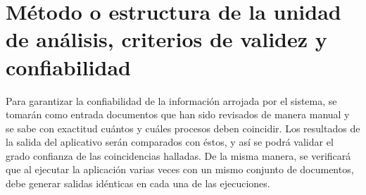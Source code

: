 \chapter{M\'etodo o estructura de la unidad de an\'alisis, criterios de validez y confiabilidad}
\label{sec:analisis}
Para garantizar la confiabilidad de la informaci\'on arrojada por el 
sistema, se tomar\'an como entrada documentos que han sido revisados de 
manera manual y se sabe con exactitud cu\'antos y cu\'ales procesos deben 
coincidir. Los resultados de la salida del aplicativo ser\'an comparados 
con \'estos, y as\'i se podr\'a validar el grado confianza de las coincidencias
halladas. De la misma manera, se verificar\'a que al ejecutar la aplicaci\'on
varias veces con un mismo conjunto de documentos, debe generar salidas 
id\'enticas en cada una de las ejecuciones.
\pagebreak